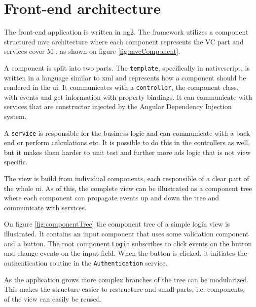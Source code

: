\section{Front-end architecture}
The front-end application is written in \gls{ng2}.
The framework utilizes a component structured \gls{mvc} architecture where each component represents the VC part and services cover M \citep{architecture:ng}, as shown on figure \ref{fig:mvcComponent}.

A component is split into two parts.
The \verb+template+, specifically in \gls{nativescript}, is written in a language similar to \gls{xml} and represents how a component should be rendered in the \gls{ui}.
It communicates with a \verb+controller+, the component class, with events and get information with property bindings.
It can communicate with services that are constructor injected by the Angular Dependency Injection system.

A \verb+service+ is responsible for the business logic and can communicate with a back-end or perform calculations etc.
It is possible to do this in the controllers as well, but it makes them harder to unit test and further more ads logic that is not view specific.


The view is build from individual components, each responsible of a clear part of the whole \gls{ui}.
As of this, the complete view can be illustrated as a component tree where each component can propagate events up and down the tree and communicate with services.

On figure \ref{fig:componentTree} the component tree of a simple login view is illustrated.
It contains an input component that uses some validation component and a button.
The root component \verb+Login+ subscribes to click events on the button and change events on the input field.
When the button is clicked, it initiates the authentication routine in the \verb+Authentication+ service.

As the application grows more complex branches of the tree can be modularized.
This makes the structure easier to restructure and small parts, i.e. components, of the view can easily be reused.





